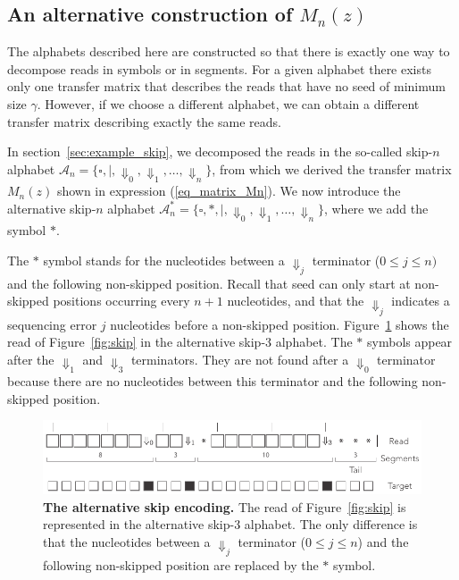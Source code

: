 \documentclass{article}
\begin{document}
\subsection{An alternative construction of $M_n(z)$}
\label{app_Mn}

The alphabets described here are constructed so that there is exactly one
way to decompose reads in symbols or in segments. For a given alphabet
there exists only one transfer matrix that describes the reads that have
no seed of minimum size $\gamma$. However, if we choose a different
alphabet, we can obtain a different transfer matrix describing exactly the
same reads.

In section~\ref{sec:example_skip}, we decomposed the reads in
the so-called skip-$n$ alphabet $\mathcal{A}_n = \{\square, |,
\Downarrow_0, \Downarrow_1, \ldots, \Downarrow_n \}$, from which we
derived the transfer matrix $M_n(z)$ shown in expression
(\ref{eq_matrix_Mn}). We now introduce the alternative skip-$n$ alphabet
$\mathcal{A}^*_n = \{\square, *, |, \Downarrow_0, \Downarrow_1, \ldots,
\Downarrow_n \}$, where we add the symbol $*$.

The $*$ symbol stands for the nucleotides between a $\Downarrow_j$
terminator ($0 \leq j \leq n)$ and the following non-skipped position.
Recall that seed can only start at non-skipped positions occurring every
$n+1$ nucleotides, and that the $\Downarrow_j$ indicates a sequencing
error $j$ nucleotides before a non-skipped position.
Figure~\ref{fig_alt_skip} shows the read of Figure~\ref{fig:skip} in the
alternative skip-3 alphabet. The $*$ symbols appear after the
$\Downarrow_1$ and $\Downarrow_3$ terminators. They are not found after a
$\Downarrow_0$ terminator because there are no nucleotides between this
terminator and the following non-skipped position.

\begin{figure}[h]
\centering
\includegraphics[scale=0.85]{alternative_sketch_skip.pdf}
\caption{\textbf{The alternative skip encoding.}
The read of Figure~\ref{fig:skip} is represented in the alternative skip-3
alphabet. The only difference is that the nucleotides between a
$\Downarrow_j$ terminator ($0 \leq j \leq n$) and the following
non-skipped position are replaced by the $*$ symbol.}
\label{fig_alt_skip}
\end{figure}
\end{document}
